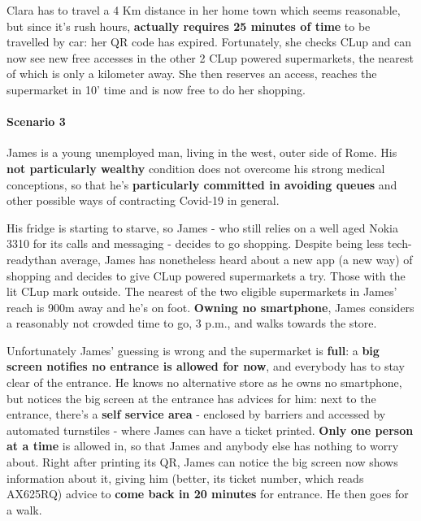 Clara has to travel a 4 Km distance in her home town which seems reasonable, but since it's rush hours, \textbf{actually requires 25 minutes of time} to be travelled by car: her QR code has expired.\newline
Fortunately, she checks CLup and can now see new free accesses in the other 2 CLup powered supermarkets, the nearest of which is only a kilometer away. She then reserves an access, reaches the supermarket in 10' time and is now free to do her shopping.

\paragraph{Scenario 3}
James is a young unemployed man, living in the west, outer side of Rome. His \textbf{not particularly wealthy} condition does not overcome his strong medical conceptions, so that he's \textbf{particularly committed in avoiding queues} and other possible ways of contracting Covid-19 in general.

His fridge is starting to starve, so James - who still relies on a well aged Nokia 3310 for its calls and messaging - decides to go shopping. Despite being \guillemotleft less tech-ready\guillemotright \space than average, James has nonetheless heard about a new app (a new way) of shopping and decides to give CLup powered supermarkets a try. Those with the lit CLup mark outside.
\newline The nearest of the two eligible supermarkets in James' reach is 900m away and he's on foot. \textbf{Owning no smartphone}, James considers a reasonably not crowded time to go, 3 p.m., and walks towards the store. 

Unfortunately James' guessing is wrong and the supermarket is \textbf{full}: a \textbf{big screen notifies no entrance is allowed for now}, and everybody has to stay clear of the entrance. He knows no alternative store as he owns no smartphone, but notices the big screen at the entrance has advices for him: next to the entrance, there's a \textbf{self service area} - enclosed by barriers and accessed by automated turnstiles - where James can have a ticket printed. \textbf{Only one person at a time} is allowed in, so that James and anybody else has nothing to worry about.
\newline Right after printing its QR, James can notice the big screen now shows information about it, giving him (better, its ticket number, which reads AX625RQ) advice to \textbf{come back in 20 minutes} for entrance. He then goes for a walk.

